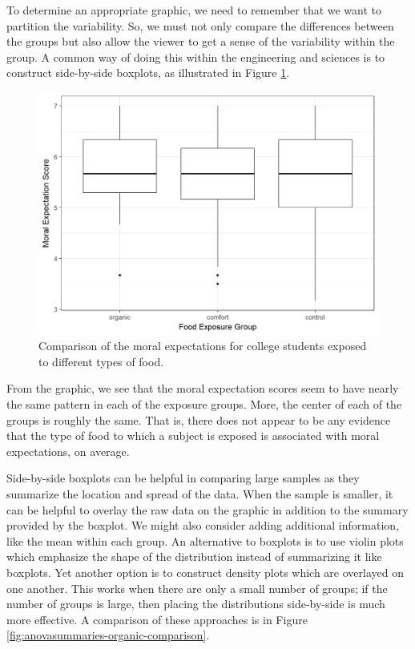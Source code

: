\documentclass[]{book}
\theoremstyle{definition}
\theoremstyle{definition}
\theoremstyle{definition}
\theoremstyle{remark}
\begin{document}
To determine an appropriate graphic, we need to remember that we want to
partition the variability. So, we must not only compare the differences
between the groups but also allow the viewer to get a sense of the
variability within the group. A common way of doing this within the
engineering and sciences is to construct side-by-side boxplots, as
illustrated in Figure \ref{fig:anovasummaries-organic-boxplot}.

\begin{figure}

{\centering \includegraphics[width=0.8\linewidth]{./Images/anovasummaries-organic-boxplot-1} 

}

\caption{Comparison of the moral expectations for college students exposed to different types of food.}\label{fig:anovasummaries-organic-boxplot}
\end{figure}

From the graphic, we see that the moral expectation scores seem to have
nearly the same pattern in each of the exposure groups. More, the center
of each of the groups is roughly the same. That is, there does not
appear to be any evidence that the type of food to which a subject is
exposed is associated with moral expectations, on average.

Side-by-side boxplots can be helpful in comparing large samples as they
summarize the location and spread of the data. When the sample is
smaller, it can be helpful to overlay the raw data on the graphic in
addition to the summary provided by the boxplot. We might also consider
adding additional information, like the mean within each group. An
alternative to boxplots is to use violin plots which emphasize the shape
of the distribution instead of summarizing it like boxplots. Yet another
option is to construct density plots which are overlayed on one another.
This works when there are only a small number of groups; if the number
of groups is large, then placing the distributions side-by-side is much
more effective. A comparison of these approaches is in Figure
\ref{fig:anovasummaries-organic-comparison}.
\end{document}
